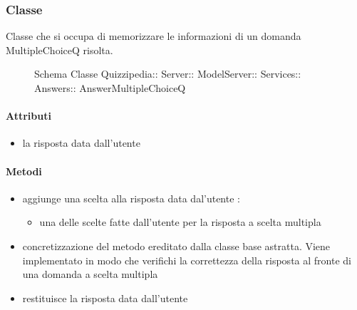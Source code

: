 \subsubsection{Classe }
Classe che si occupa di memorizzare le informazioni di un domanda MultipleChoiceQ risolta.
\begin{figure}[H]
\centering
\noindent{}
\caption[Schema Classe AnswerMultipleChoiceQ]{Schema Classe Quizzipedia:: Server:: ModelServer:: Services:: Answers:: AnswerMultipleChoiceQ}
\end{figure}
\paragraph{Attributi}
\begin{itemize}
\item {}
\newline
la risposta data dall'utente
\end{itemize}
\paragraph{Metodi}
\begin{itemize}
\item {}
\newline
aggiunge una scelta alla risposta data dal'utente
\newline
{} :
\begin{itemize}
\item {}
\newline
una delle scelte fatte dall'utente per la risposta a scelta multipla
\end{itemize}
\item {}
\newline
concretizzazione del metodo ereditato dalla classe base astratta. Viene implementato in modo che verifichi la correttezza della risposta al fronte di una domanda a scelta multipla
\newline
\item {}
\newline
restituisce la risposta data dall'utente
\newline
\end{itemize}
